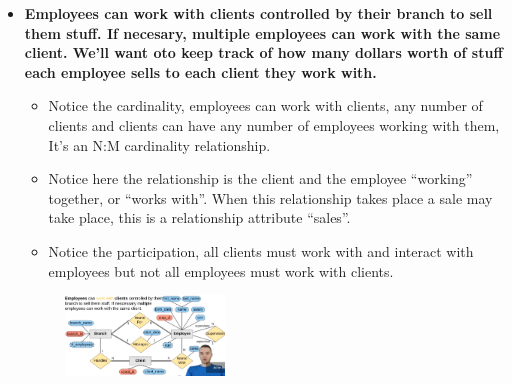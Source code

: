 \begin{itemize}
    \item \textbf{Employees can work with clients controlled by their branch to sell them stuff. If necesary, multiple employees can work with the same client. We'll want oto keep track of how many dollars worth of stuff each employee sells to each client they work with.}
        \begin{itemize}
            \item Notice the cardinality, employees can work with clients, any number of clients and clients can have any number of employees working with them, It's an N:M cardinality relationship.
            \item Notice here the relationship is the client and the employee ``working'' together, or ``works with''. When this relationship takes place a sale may take place, this is a relationship attribute ``sales''.
            \item Notice the participation, all clients must work with and interact with employees but not all employees must work with clients.
        \end{itemize}
        \begin{figure}[H]
            \centering
            \includegraphics[width=0.4\textwidth]{./Figs/2020-12-24-00-39-58.png}
        \end{figure}


\end{itemize}

